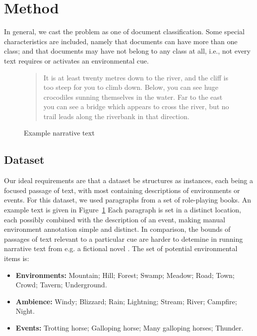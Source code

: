 \documentclass[10pt,a4paper]{article}
\begin{document}
\section{Method}

In general, we cast the problem as one of document classification.
Some special characteristics are included, namely that documents can have more than one class; and that documents may have not belong to any class at all, i.e., not every text requires or activates an environmental cue.

\begin{figure}
\centering
\begin{quote}
{\selectfont
It is at least twenty metres down to the river, and the cliff is too steep for you to climb down.
Below, you can see huge crocodiles sunning themselves in the water.
Far to the east you can see a bridge which appears to cross the river, but no trail leads along the riverbank in that direction.
}
\end{quote}
\label{fig:ff-para}
\caption{Example narrative text}
\end{figure}

\subsection{Dataset}
Our ideal requirements are that a dataset be structures as instances, each being a focused passage of text, with most containing descriptions of environments or events.
For this dataset, we used paragraphs from a set of role-playing books.%
An example text is given in Figure~\ref{fig:ff-para}
Each paragraph is set in a distinct location, each possibly combined with the description of an event, making manual environment annotation simple and distinct.
In comparison, the bounds of passages of text relevant to a particular cue are harder to detemine in running narrative text from e.g. a fictional novel .
The set of potential environmental items is:

\begin{itemize}
\item {\bf Environments:} Mountain; Hill; Forest; Swamp; Meadow; Road; Town; Crowd; Tavern; Underground.
\item {\bf Ambience:} Windy; Blizzard; Rain; Lightning; Stream; River; Campfire; Night.
\item {\bf Events:} Trotting horse; Galloping horse; Many galloping horses; Thunder.
\end{itemize}
\end{document}
